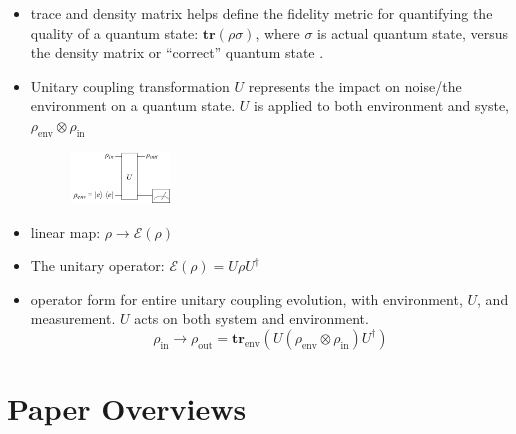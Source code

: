 \documentclass [12pt]{article}
\begin{document}
\begin{itemize}
            \item trace and density matrix helps define the fidelity metric for quantifying the quality of a quantum state: $ \textbf{tr}(\rho \sigma)  $, where $\sigma$ is actual quantum state, versus the density matrix or ``correct'' quantum state \cite{resch21}.
            
            \item Unitary coupling transformation $U$ represents the impact on noise/the environment on a quantum state. $U$ is applied to both environment and syste, $\rho_{\text{env}} \otimes \rho_{\text{in}}$
            
                \begin{figure}[htb!]
                    \centering
                    \includegraphics[width=0.25\textwidth]{images/unitaryCouplingTransformation.png}
                \end{figure}

            \item linear map: $\rho \rightarrow \mathcal{E}(\rho)$
            \item The unitary operator: $ \mathcal{E}(\rho) = U \rho U^{\dag} $
            \item operator form for entire unitary coupling evolution, with environment, $U$, and measurement. $U$ acts on both system and environment.  
                $$ \rho_{\text{in}} \rightarrow \rho_{\text{out}} = \textbf{tr}_{\text{env}}(U (\rho_{\text{env}} \otimes \rho_{\text{in}}) U^{\dag}) $$
        \end{itemize}


    \section{Paper Overviews} %
\end{document}
